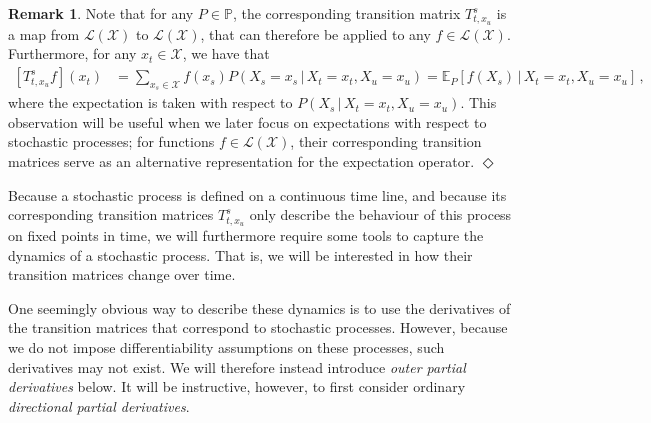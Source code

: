 \documentclass[10pt,a4paper]{paper}
\theoremstyle{definition}
\newtheorem{remark}{Remark}
\newcommand{\states}{\mathcal{X}}
\newcommand{\processes}{\mathbb{P}}
\newcommand{\gambles}{\mathcal{L}}
\newcommand{\gamblesX}{\gambles(\states)}
\newcommand{\exampleend}{\hfill$\Diamond$}
\begin{document}
\begin{remark}\label{remark:expectationT}
Note that for any $P\in\processes$, the corresponding transition matrix $T_{t, x_u}^s$ is a map from $\gamblesX$ to $\gamblesX$, that can therefore be applied to any $f\in\gamblesX$. Furthermore, for any $x_t\in\states$, we have that
\begin{align*}
\left[T_{t,x_u}^sf\right](x_t) &= \sum_{x_s\in\states}f(x_s)P(X_s=x_s\,\vert\,X_t=x_t,X_u=x_u)= \mathbb{E}_P\left[f(X_s)\,\vert\,X_t=x_t, X_u=x_u\right]\,,
\end{align*}
where the expectation is taken with respect to $P(X_s\,\vert\,X_t=x_t,X_u=x_u)$. This observation will be useful when we later focus on expectations with respect to stochastic processes; for functions $f\in\gamblesX$, their corresponding transition matrices serve as an alternative representation for the expectation operator.  %
\exampleend
\end{remark}

Because a stochastic process is defined on a continuous time line, and because its corresponding transition matrices $T_{t,x_u}^s$ only describe the behaviour of this process on fixed points in time, we will furthermore require some tools to capture the dynamics of a stochastic process. That is, we will be interested in how their transition matrices change over time.

One seemingly obvious way to describe these dynamics is to use the derivatives of the transition matrices that correspond to stochastic processes. However, because we do not impose differentiability assumptions on these processes, such derivatives may not exist. We will therefore instead introduce \emph{outer partial derivatives} below. It will be instructive, however, to first consider ordinary \emph{directional partial derivatives}.

\end{document}
